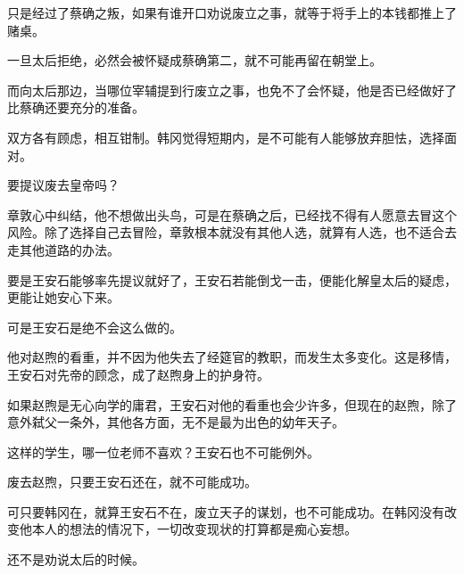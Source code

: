 只是经过了蔡确之叛，如果有谁开口劝说废立之事，就等于将手上的本钱都推上了赌桌。

一旦太后拒绝，必然会被怀疑成蔡确第二，就不可能再留在朝堂上。

而向太后那边，当哪位宰辅提到行废立之事，也免不了会怀疑，他是否已经做好了比蔡确还要充分的准备。

双方各有顾虑，相互钳制。韩冈觉得短期内，是不可能有人能够放弃胆怯，选择面对。

要提议废去皇帝吗？

章敦心中纠结，他不想做出头鸟，可是在蔡确之后，已经找不得有人愿意去冒这个风险。除了选择自己去冒险，章敦根本就没有其他人选，就算有人选，也不适合去走其他道路的办法。

要是王安石能够率先提议就好了，王安石若能倒戈一击，便能化解皇太后的疑虑，更能让她安心下来。

可是王安石是绝不会这么做的。

他对赵煦的看重，并不因为他失去了经筵官的教职，而发生太多变化。这是移情，王安石对先帝的顾念，成了赵煦身上的护身符。

如果赵煦是无心向学的庸君，王安石对他的看重也会少许多，但现在的赵煦，除了意外弑父一条外，其他各方面，无不是最为出色的幼年天子。

这样的学生，哪一位老师不喜欢？王安石也不可能例外。

废去赵煦，只要王安石还在，就不可能成功。

可只要韩冈在，就算王安石不在，废立天子的谋划，也不可能成功。在韩冈没有改变他本人的想法的情况下，一切改变现状的打算都是痴心妄想。

还不是劝说太后的时候。

